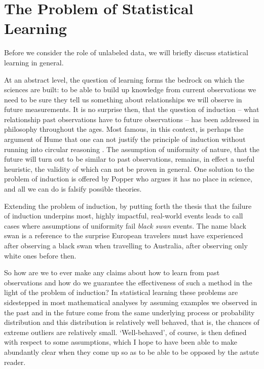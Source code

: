 \documentclass[twoside]{memoir}\usepackage[]{graphicx}\usepackage{xcolor}
\renewcommand{\cite}{\citep}
\begin{document}
\section{The Problem of Statistical Learning}
Before we consider the role of unlabeled data, we will briefly discuss statistical learning in general.

At an abstract level, the question of learning forms the bedrock on which the sciences are built: to be able to build up knowledge from current observations we need to be sure they tell us something about relationships we will observe in future measurements. It is no surprise then, that the question of induction --  what relationship past observations have to future observations -- has been addressed in philosophy throughout the ages. Most famous, in this context, is perhaps the argument of Hume that one can not justify the principle of induction without running into circular reasoning \cite{Vickers2016}. The assumption of uniformity of nature, that the future will turn out to be similar to past observations, remains, in effect a useful heuristic, the validity of which can not be proven in general. One solution to the problem of induction is offered by Popper who argues it has no place in science, and all we can do is falsify possible theories.

Extending the problem of induction, by putting forth the thesis that the failure of induction underpins most, highly impactful, real-world events leads \citet{Taleb2007} to call cases where assumptions of uniformity fail \emph{black swan} events. The name black swan is a reference to the surprise European travelers must have experienced after observing a black swan when travelling to Australia, after observing only white ones before then.

So how are we to ever make any claims about how to learn from past observations and how do we guarantee the effectiveness of such a method in the light of the problem of induction? In statistical learning these problems are sidestepped in most mathematical analyses by assuming examples we observed in the past and in the future come from the same underlying process or probability distribution and this distribution is relatively well behaved, that is, the chances of extreme outliers are relatively small. `Well-behaved', of course, is then defined with respect to some assumptions, which I hope to have been able to make abundantly clear when they come up so as to be able to be opposed by the astute reader.
\end{document}
